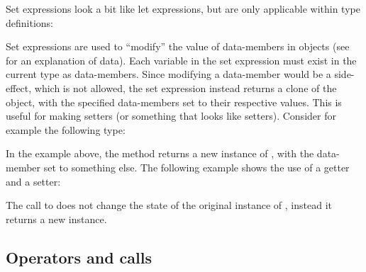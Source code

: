 Set expressions look a bit like let expressions, but are only applicable within type definitions:

\begin{ebnf}
\end{ebnf}

Set expressions are used to ``modify'' the value of data-members in objects (see 
for an explanation of data). Each variable in the set expression must exist in the current type as
data-members. Since modifying a data-member would be a side-effect, which is not allowed, the set expression
instead returns a clone of the object, with the specified data-members set to their respective values. This
is useful for making setters (or something that looks like setters). Consider for example the following
type:


In the example above, the method  returns a new instance of , with
the data-member  set to something else. The following example shows the use of
a getter and a setter:


The call to  does not change the state of the original instance of ,
instead it returns a new instance.

\subsection{Operators and calls}
\label{sec:operatorsandcalls}

\begin{ebnf}
\end{ebnf}

